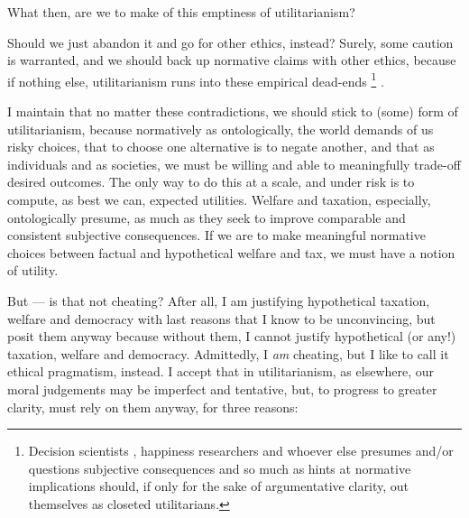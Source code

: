 What then, are we to make of this emptiness of utilitarianism?

Should we just abandon it and go for other ethics, instead? Surely, some caution is warranted, and we should back up normative claims with other ethics, because if nothing else, utilitarianism runs into these empirical dead-ends
\footnote{
	Decision scientists \citep[for example,][]{Kahneman2011}, happiness researchers \citep[for example,][]{Veenhoven-2000-aa} and whoever else presumes and/or questions subjective consequences and so much as hints at normative implications should, if only for the sake of argumentative clarity, out themselves as closeted utilitarians.
}
.

I maintain that no matter these contradictions, we should stick to (some) form of utilitarianism, because normatively as ontologically, the world demands of us risky choices, that to choose one alternative is to negate another, and that as individuals and as societies, we must be willing and able to meaningfully trade-off desired outcomes. 
The only way to do this at a scale, and under risk is to compute, as best we can, expected utilities.
Welfare and taxation, especially, ontologically presume, as much as they seek to improve comparable and consistent subjective consequences.
If we are to make meaningful normative choices between factual and hypothetical welfare and tax, we must have a notion of utility.

But --- is that not cheating? %
After all, I am justifying hypothetical taxation, welfare and democracy with last reasons that I know to be unconvincing, but posit them anyway because without them, I cannot justify hypothetical (or any!) taxation, welfare and democracy. 
Admittedly, I \emph{am} cheating, but I like to call it ethical pragmatism, instead.
I accept that in utilitarianism, as elsewhere, our moral judgements may be imperfect and tentative, but, to progress to greater clarity, must rely on them anyway, for three reasons:

